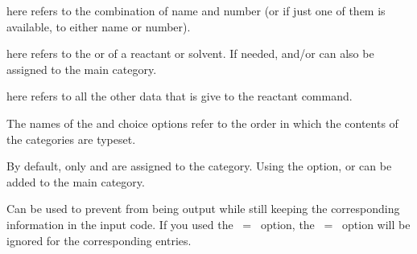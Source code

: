 \documentclass{chemmacros-manual}
\begin{document}
 here refers to the combination of name and number (or if just one of them is  available,
 to either name or number).
    
 here refers to the  or  of a reactant or solvent. If needed, 
  and/or  can also be assigned to the main category.
    
 here refers to all the other data that is give to the reactant command.

The names of the  and  choice options 
refer to the order in which the contents of the categories are typeset.

\begin{example}
  \par
  \par
  
  \par
\end{example}

\begin{options}
  By default, only  and  are assigned to the  category. Using 
  the  option,   or  can be added to the main 
  category. 
\end{options}
  
\begin{example}
  \par
  \par
\end{example}

\begin{options}
  Can be used to prevent  from being output while still keeping the corresponding 
  information in the input code. If you used the ~=~ option, the 
  ~=~ option will be ignored for the corresponding entries.
\end{options}
\end{document}

